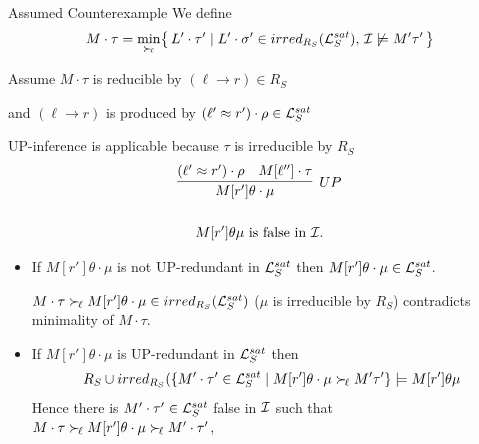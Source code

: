 \documentclass[%
handout,
]{beamer}
\begin{document}
\begin{frame}[allowframebreaks]{Assumed Counterexample}
    \framebreak
    We define
    \begin{gather*}
        M\cdot\tau = \min_{\mathrel\succ_{\!\ell}}\!
\left\{\,
    L'\cdot\tau' \mid
    L'\cdot\sigma' \in irred_{R_S}(\mathcal{L}_S^{sat}),\,
    \mathcal{I} \not\models M'\tau'\,
\right\}
    \end{gather*}

Assume $M\cdot\tau$ is reducible by $(\ell\to r)\in R_S$

        and $(\ell\to r)$ is produced by $(\ell'\approx r')\cdot\rho\in\mathcal{L}_S^{sat}$

        \vspace{0.7em}
        UP-inference is applicable because $\tau$ is irreducible by $R_S$
        \begin{gather*}
            \infer[UP]
            {M[r']\theta\cdot\mu}
            {(\ell'\mEQ r')\cdot\rho & M[\ell'']\cdot\tau}
            \\
            \\
            M[r']\theta\mu\text{ is false in } \mcI.
        \end{gather*}


        \framebreak

        \begin{itemize}
            \item If $M[r']\theta\cdot\mu$ is not UP-redundant in $\mathcal{L}_S^{sat}$
            then $M[r']\theta\cdot\mu\in\mathcal{L}_S^{sat}$.

            \vspace{0.7em}
            $M\cdot\tau\mathrel\succ_{\!\ell} 
            M[r']\theta\cdot\mu\in irred_{R_S}(\mathcal{L}_S^{sat})$ ($\mu$ is irreducible by $R_S$)
            contradicts minimality of $M\cdot\tau$.


            \vspace{0.7em}
            \item If $M[r']\theta\cdot\mu$ is UP-redundant in $\mathcal{L}_S^{sat}$ then 
            \begin{gather*}
                R_S \cup irred_{R_S}(
                \{
                    M'\cdot\tau'\in\mathcal{L}_S^{sat}\mid
                    M[r']\theta\cdot\mu \mathrel\succ_{\!\ell} M'\tau'
                    \} \models M[r']\theta\mu
            \end{gather*}
            Hence there is $M'\cdot\tau'\in\mathcal{L}_S^{sat}$ false in $\mathcal{I}$ such that 
            $M\cdot\tau\mathrel\succ_{\!\ell} M[r']\theta\cdot\mu\mathrel\succ_{\!\ell} M'\cdot\tau'$,


\end{itemize}
\end{frame}
\end{document}
